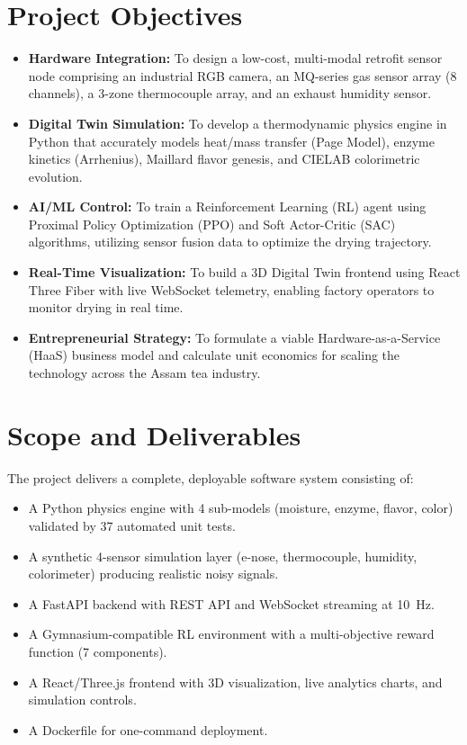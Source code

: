 ﻿\documentclass[12pt, a4paper]{report}
\begin{document}
\section{Project Objectives}
\begin{itemize}
    \item \textbf{Hardware Integration:} To design a low-cost, multi-modal retrofit sensor node comprising an industrial RGB camera, an MQ-series gas sensor array (8 channels), a 3-zone thermocouple array, and an exhaust humidity sensor.
    \item \textbf{Digital Twin Simulation:} To develop a thermodynamic physics engine in Python that accurately models heat/mass transfer (Page Model), enzyme kinetics (Arrhenius), Maillard flavor genesis, and CIELAB colorimetric evolution.
    \item \textbf{AI/ML Control:} To train a Reinforcement Learning (RL) agent using Proximal Policy Optimization (PPO) and Soft Actor-Critic (SAC) algorithms, utilizing sensor fusion data to optimize the drying trajectory.
    \item \textbf{Real-Time Visualization:} To build a 3D Digital Twin frontend using React Three Fiber with live WebSocket telemetry, enabling factory operators to monitor drying in real time.
    \item \textbf{Entrepreneurial Strategy:} To formulate a viable Hardware-as-a-Service (HaaS) business model and calculate unit economics for scaling the technology across the Assam tea industry.
\end{itemize}

\section{Scope and Deliverables}
The project delivers a complete, deployable software system consisting of:
\begin{itemize}
    \item A Python physics engine with 4 sub-models (moisture, enzyme, flavor, color) validated by 37 automated unit tests.
    \item A synthetic 4-sensor simulation layer (e-nose, thermocouple, humidity, colorimeter) producing realistic noisy signals.
    \item A FastAPI backend with REST API and WebSocket streaming at 10~Hz.
    \item A Gymnasium-compatible RL environment with a multi-objective reward function (7 components).
    \item A React/Three.js frontend with 3D visualization, live analytics charts, and simulation controls.
    \item A Dockerfile for one-command deployment.
\end{itemize}
\end{document}
